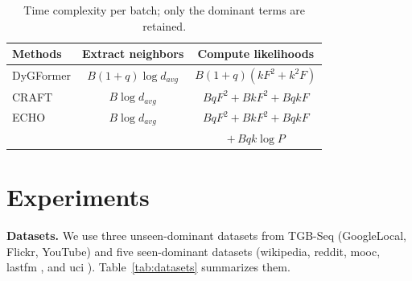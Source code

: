 \documentclass[twoside]{article}
\newcommand{\ours}{ECHO}
\begin{document}
\begin{table}[t]
\caption{Time complexity per batch; only the dominant terms are retained.}
\label{tab:complexity}
\begin{center}
\small
\setlength{\tabcolsep}{3pt}
\begin{tabular}{lcc}
\toprule
Methods & Extract neighbors & Compute likelihoods \\
\midrule
DyGFormer & $B(1+q)\log d_{avg}$ & $B(1+q)(kF^2+k^2F)$ \\
CRAFT & $B\log d_{avg}$ & $BqF^2+BkF^2+BqkF$ \\
\ours{} & $B\log d_{avg}$ & $BqF^2+BkF^2+BqkF$ \\
 & & $+\,Bqk\log P$ \\
\bottomrule
\end{tabular}
\end{center}
\end{table}

\section{Experiments}
\label{sec:experiments}

\textbf{Datasets.} We use three unseen-dominant datasets from TGB-Seq \citep{yi2025tgbseq} (GoogleLocal, Flickr, YouTube) and five seen-dominant datasets (wikipedia, reddit, mooc, lastfm \citep{kumar2019jodie}, and uci \citep{panzarasa2009patterns}). Table~\ref{tab:datasets} summarizes them.

\begin{table}[t]
\caption{Statistics of the datasets, partially adopted from \citet{yi2025craft}.}
\label{tab:datasets}
\begin{center}
\end{center}
\end{table}
\end{document}

